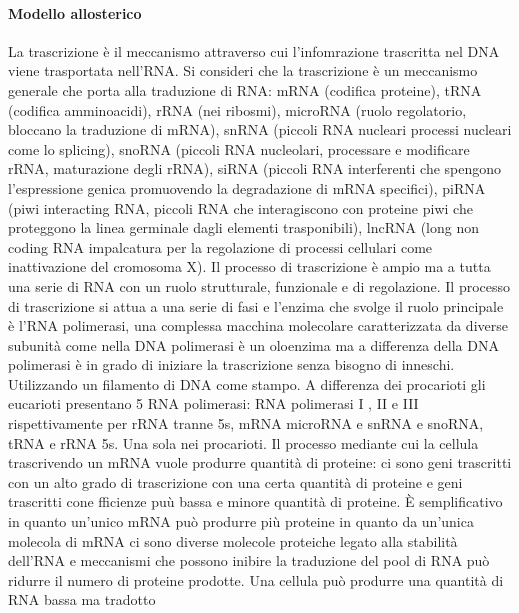 			\paragraph{Modello allosterico}












La trascrizione \`e il meccanismo attraverso cui l'infomrazione trascritta nel DNA viene trasportata nell'RNA. Si consideri che la trascrizione \`e un meccanismo generale che porta
alla traduzione di RNA: mRNA (codifica proteine), tRNA (codifica amminoacidi), rRNA (nei ribosmi), microRNA (ruolo regolatorio, bloccano la traduzione di mRNA), snRNA (piccoli RNA 
nucleari processi nucleari come lo splicing), snoRNA (piccoli RNA nucleolari, processare e modificare rRNA, maturazione degli rRNA), siRNA (piccoli RNA interferenti che spengono 
l'espressione genica promuovendo la degradazione di mRNA specifici), piRNA (piwi interacting RNA, piccoli RNA che interagiscono con proteine piwi che proteggono la linea germinale dagli
elementi trasponibili), lncRNA (long non coding RNA impalcatura per la regolazione di processi cellulari come inattivazione del cromosoma X). Il processo di trascrizione \`e ampio ma a 
tutta una serie di RNA con un ruolo strutturale, funzionale e di regolazione. Il processo di trascrizione si attua a una serie di fasi e l'enzima che svolge il ruolo principale \`e l'RNA
polimerasi, una complessa macchina molecolare caratterizzata da diverse subunit\`a come nella DNA polimerasi \`e un oloenzima ma a differenza della DNA polimerasi \`e in grado di iniziare
la trascrizione senza bisogno di inneschi. Utilizzando un filamento di DNA come stampo. A differenza dei procarioti gli eucarioti presentano 5 RNA polimerasi: RNA polimerasi I , II e III
rispettivamente per rRNA tranne 5s, mRNA microRNA e snRNA e snoRNA, tRNA e rRNA 5s. Una sola nei procarioti. Il processo mediante cui la cellula trascrivendo un mRNA vuole produrre 
quantit\`a di proteine: ci sono geni trascritti con un alto grado di trascrizione con una certa quantit\`a di proteine e geni trascritti cone fficienze pu\`u bassa e minore quantit\`a 
di proteine. \`E semplificativo in quanto un'unico mRNA pu\`o produrre pi\`u proteine in quanto da un'unica molecola di mRNA ci sono diverse molecole proteiche legato alla stabilit\`a 
dell'RNA e meccanismi che possono inibire la traduzione del pool di RNA pu\`o ridurre il numero di proteine prodotte. Una cellula pu\`o produrre una quantit\`a di RNA bassa ma tradotto
